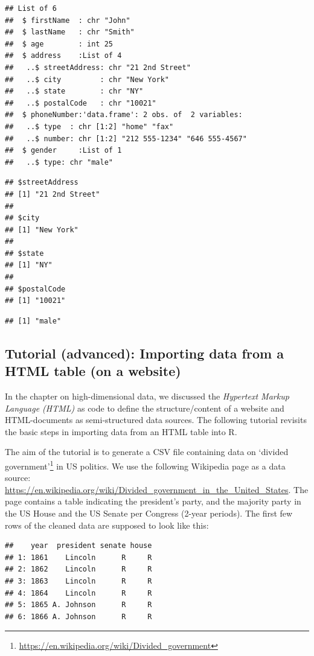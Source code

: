 \documentclass[
  12pt,
]{style/krantz}
\renewcommand{\href}[2]{#2\footnote{\url{#1}}}
\begin{document}
\begin{verbatim}
## List of 6
##  $ firstName  : chr "John"
##  $ lastName   : chr "Smith"
##  $ age        : int 25
##  $ address    :List of 4
##   ..$ streetAddress: chr "21 2nd Street"
##   ..$ city         : chr "New York"
##   ..$ state        : chr "NY"
##   ..$ postalCode   : chr "10021"
##  $ phoneNumber:'data.frame': 2 obs. of  2 variables:
##   ..$ type  : chr [1:2] "home" "fax"
##   ..$ number: chr [1:2] "212 555-1234" "646 555-4567"
##  $ gender     :List of 1
##   ..$ type: chr "male"
\end{verbatim}

\begin{verbatim}
## $streetAddress
## [1] "21 2nd Street"
## 
## $city
## [1] "New York"
## 
## $state
## [1] "NY"
## 
## $postalCode
## [1] "10021"
\end{verbatim}

\begin{verbatim}
## [1] "male"
\end{verbatim}

\hypertarget{tutorial-advanced-importing-data-from-a-html-table-on-a-website}{%
\subsection{Tutorial (advanced): Importing data from a HTML table (on a website)}\label{tutorial-advanced-importing-data-from-a-html-table-on-a-website}}

In the chapter on high-dimensional data, we discussed the \emph{Hypertext Markup Language (HTML)} as code to define the structure/content of a website and HTML-documents as semi-structured data sources. The following tutorial revisits the basic steps in importing data from an HTML table into R.

The aim of the tutorial is to generate a CSV file containing data on \href{https://en.wikipedia.org/wiki/Divided_government}{`divided government'} in US politics. We use the following Wikipedia page as a data source: \url{https://en.wikipedia.org/wiki/Divided_government_in_the_United_States}. The page contains a table indicating the president's party, and the majority party in the US House and the US Senate per Congress (2-year periods). The first few rows of the cleaned data are supposed to look like this:

\begin{verbatim}
##    year  president senate house
## 1: 1861    Lincoln      R     R
## 2: 1862    Lincoln      R     R
## 3: 1863    Lincoln      R     R
## 4: 1864    Lincoln      R     R
## 5: 1865 A. Johnson      R     R
## 6: 1866 A. Johnson      R     R
\end{verbatim}
\end{document}
